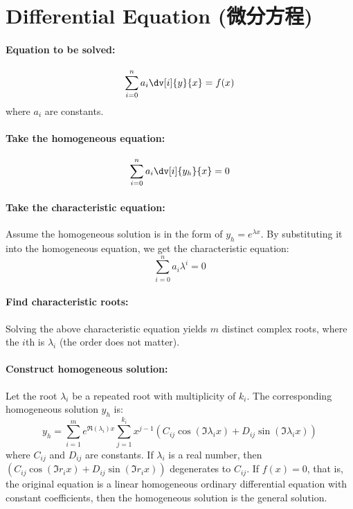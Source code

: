 \section{Differential Equation (微分方程)}
\paragraph*{Equation to be solved:}
\[\sum_{i=0}^na_i\dv[i]{y}{x}=f(x)\]
where $a_i$ are constants.

\paragraph{Take the homogeneous equation:}
\[\sum_{i=0}^na_i\dv[i]{y_h}{x}=0\]

\paragraph{Take the characteristic equation:}

Assume the homogeneous solution is in the form of $y_h=e^{\lambda x}$. By substituting it into the homogeneous equation, we get the characteristic equation:
\[\sum_{i=0}^na_i\lambda^i=0\]
\paragraph{Find characteristic roots:}

Solving the above characteristic equation yields $m$ distinct complex roots, where the $i$th is $\lambda_i$ (the order does not matter).

\paragraph{Construct homogeneous solution:}

Let the root $\lambda_i$ be a repeated root with multiplicity of $k_i$. The corresponding homogeneous solution $y_h$ is:
\[y_h=\sum_{i=1}^me^{\Re(\lambda_i)x}\sum_{j=1}^{k_i}x^{j-1}\left(C_{ij}\cos(\Im{\lambda_i}x)+D_{ij}\sin(\Im{\lambda_i}x)\right)\]
where $C_{ij}$ and $D_{ij}$ are constants. If $\lambda_i$ is a real number, then $\left(C_{ij}\cos(\Im{r_i}x)+D_{ij}\sin(\Im{r_i}x)\right)$ degenerates to $C_{ij}$. If $f(x)=0$, that is, the original equation is a linear homogeneous ordinary differential equation with constant coefficients, then the homogeneous solution is the general solution.


